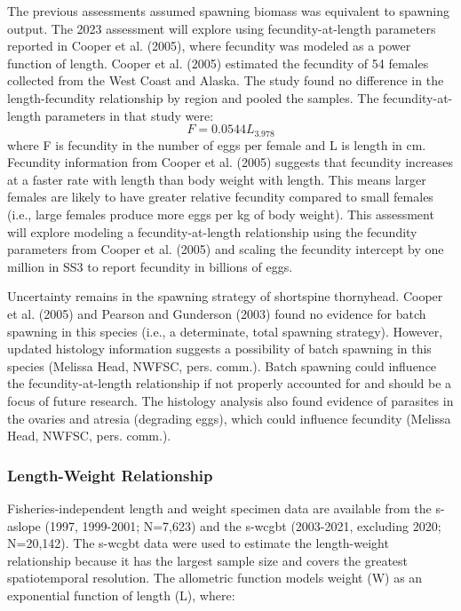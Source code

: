 \documentclass[11pt,
  english,
  letterpaper,
]{article}
\begin{document}
The previous assessments assumed spawning biomass was equivalent to spawning output. The 2023 assessment will explore using fecundity-at-length parameters reported in Cooper et al. (2005), where fecundity was modeled as a power function of length. Cooper et al. (2005) estimated the fecundity of 54 females collected from the West Coast and Alaska. The study found no difference in the length-fecundity relationship by region and pooled the samples. The fecundity-at-length parameters in that study were: \begin{equation} F = 0.0544L_{3.978} \end{equation} where F is fecundity in the number of eggs per female and L is length in cm. Fecundity information from Cooper et al. (2005) suggests that fecundity increases at a faster rate with length than body weight with length. This means larger females are likely to have greater relative fecundity compared to small females (i.e., large females produce more eggs per kg of body weight). This assessment will explore modeling a fecundity-at-length relationship using the fecundity parameters from Cooper et al. (2005) and scaling the fecundity intercept by one million in SS3 to report fecundity in billions of eggs.

Uncertainty remains in the spawning strategy of shortspine thornyhead. Cooper et al. (2005) and Pearson and Gunderson (2003) found no evidence for batch spawning in this species (i.e., a determinate, total spawning strategy). However, updated histology information suggests a possibility of batch spawning in this species (Melissa Head, NWFSC, pers. comm.). Batch spawning could influence the fecundity-at-length relationship if not properly accounted for and should be a focus of future research. The histology analysis also found evidence of parasites in the ovaries and atresia (degrading eggs), which could influence fecundity (Melissa Head, NWFSC, pers. comm.).

\hypertarget{length-weight-relationship}{%
\subsubsection{Length-Weight Relationship}\label{length-weight-relationship}}

Fisheries-independent length and weight specimen data are available from the \gls{s-aslope} (1997, 1999-2001; N=7,623) and the \gls{s-wcgbt} (2003-2021, excluding 2020; N=20,142). The \gls{s-wcgbt} data were used to estimate the length-weight relationship because it has the largest sample size and covers the greatest spatiotemporal resolution. The allometric function models weight (W) as an exponential function of length (L), where:
\end{document}

